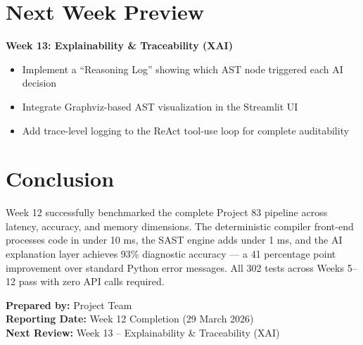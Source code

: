 \documentclass[a4paper,11pt]{article}
\begin{document}
\section{Next Week Preview}

\textbf{Week 13: Explainability \& Traceability (XAI)}

\begin{itemize}[leftmargin=*]
    \item Implement a ``Reasoning Log'' showing which AST node triggered each AI decision
    \item Integrate Graphviz-based AST visualization in the Streamlit UI
    \item Add trace-level logging to the ReAct tool-use loop for complete auditability
\end{itemize}

\section{Conclusion}

Week 12 successfully benchmarked the complete Project 83 pipeline across latency, accuracy, and memory dimensions. The deterministic compiler front-end processes code in under 10 ms, the SAST engine adds under 1 ms, and the AI explanation layer achieves 93\% diagnostic accuracy — a 41 percentage point improvement over standard Python error messages. All 302 tests across Weeks 5--12 pass with zero API calls required.

\vspace{5mm}
\noindent\textbf{Prepared by:} Project Team \\
\textbf{Reporting Date:} Week 12 Completion (29 March 2026) \\
\textbf{Next Review:} Week 13 -- Explainability \& Traceability (XAI)
\end{document}
